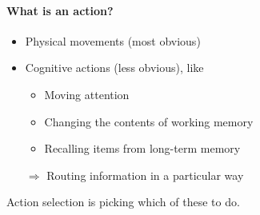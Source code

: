 \documentclass[10pt,letterpaper,oneside]{article}
\begin{document}
\paragraph{What is an action?}
\begin{itemize}
	\item Physical movements (most obvious)
	\item Cognitive actions (less obvious), like
	\begin{itemize}
    \item Moving attention
    \item Changing the contents of working memory
    \item Recalling items from long-term memory
  \end{itemize}
	\item[$\Rightarrow$] Routing information in a particular way
\end{itemize}

Action selection is picking which of these to do.
\end{document}

